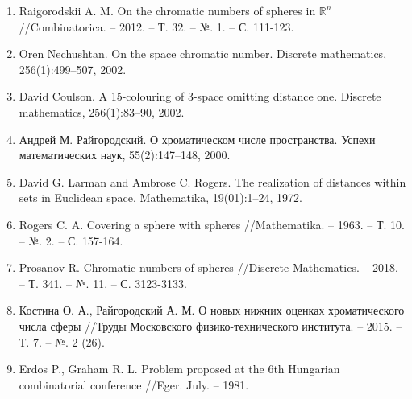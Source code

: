 \begin{enumerate}
\item\label{bib:RaiSphere}
Raigorodskii A. M. On the chromatic numbers of spheres in $\mathbb{R}^n$ //Combinatorica. – 2012. – Т. 32. – №. 1. – С. 111-123.

\item\label{bib:Nech}
Oren Nechushtan. On the space chromatic number. Discrete mathematics, 256(1):499–507, 2002.

\item\label{bib:Coul}
David Coulson. A 15-colouring of 3-space omitting distance one. Discrete mathematics, 256(1):83–90, 2002.

\item\label{bib:Rai1}
Андрей М. Райгородский. О хроматическом числе пространства. Успехи математических наук, 55(2):147–148, 2000.

\item\label{bib:Larm}
David G. Larman and Ambrose C. Rogers. The realization of distances within sets in Euclidean space. Mathematika, 19(01):1–24, 1972. 

\item\label{bib:Rogers}
Rogers C. A. Covering a sphere with spheres //Mathematika. – 1963. – Т. 10. – №. 2. – С. 157-164.

\item\label{bib:Pros}
Prosanov R. Chromatic numbers of spheres //Discrete Mathematics. – 2018. – Т. 341. – №. 11. – С. 3123-3133.

\item\label{bib:Kostina}
Костина О. А., Райгородский А. М. О новых нижних оценках хроматического числа сферы //Труды Московского физико-технического института. – 2015. – Т. 7. – №. 2 (26).

\item\label{bib:ErdosGraham}
Erdos P., Graham R. L. Problem proposed at the 6th Hungarian combinatorial conference //Eger. July. – 1981.

\end{enumerate}

